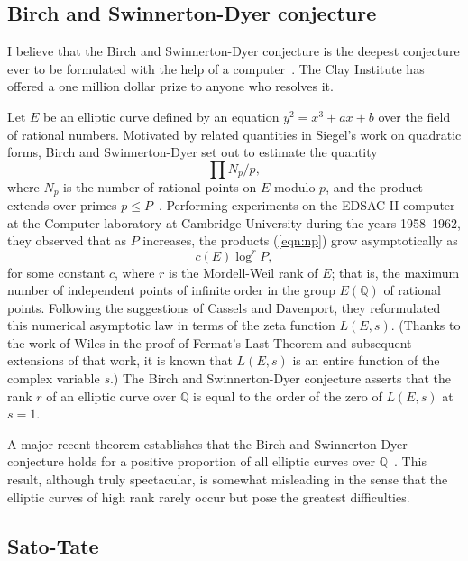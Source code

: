 \documentclass{llncs}
\newcommand{\ring}[1]{\mathbb{#1}}
\begin{document}
\subsection{Birch and Swinnerton-Dyer conjecture}

I believe that the Birch and Swinnerton-Dyer conjecture is the deepest
conjecture ever to be formulated with the help of a computer~\cite{BSD}.  The
Clay Institute has offered a one million dollar prize to anyone who
resolves it.

Let $E$  be an elliptic curve defined by
an equation $y^2 = x^3 + a x + b$ 
over the field of rational
numbers.  Motivated by related quantities in Siegel's work on quadratic forms, Birch and Swinnerton-Dyer set out to estimate the quantity
\begin{equation}\label{eqn:np}
\prod {N_p/p},
\end{equation}
where $N_p$ is the number of rational points on $E$ modulo $p$, and
the product extends over primes $p\le P$~\cite{Bir}.  Performing
experiments on the EDSAC II computer at the Computer laboratory at Cambridge University during the years 1958--1962, they observed that as $P$ increases, the products (\ref{eqn:np})
grow asymptotically as 
\[
c(E) \log^r P,
\]
for some constant $c$, where $r$ is the Mordell-Weil rank of $E$; that
is, the maximum number of independent points of infinite order in the
group $E(\ring{Q})$ of rational points.  Following the suggestions of
Cassels and Davenport, they reformulated this numerical asymptotic law in
terms of the zeta function $L(E,s)$.  (Thanks to the work of Wiles in
the proof of Fermat's Last Theorem and subsequent extensions of that
work, it is known that $L(E,s)$ is an entire function of the complex
variable $s$.)  The Birch and Swinnerton-Dyer conjecture asserts that
the rank $r$ of an elliptic curve over $\ring{Q}$ is equal to the
order of the zero of $L(E,s)$ at $s=1$.

A major recent theorem establishes that the Birch and Swinnerton-Dyer
conjecture holds for a positive proportion of all elliptic curves over
$\ring{Q}$~\cite{BS:2010}.  This result, although truly spectacular, is
somewhat misleading in the sense that the elliptic curves of high rank rarely
occur but pose the greatest difficulties.





\subsection{Sato-Tate}
\end{document}
